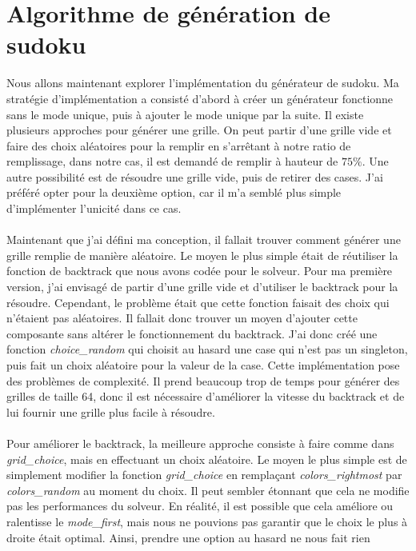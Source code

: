 \documentclass{article}
\begin{document}
\section{Algorithme de génération de sudoku}
Nous allons maintenant explorer l'implémentation du générateur de sudoku. Ma 
stratégie d'implémentation a consisté d'abord à créer un générateur fonctionne
sans le mode unique, puis à ajouter le mode unique par la suite. Il existe 
plusieurs approches pour générer une grille. On peut partir d'une grille vide 
et faire des choix aléatoires pour la remplir en s'arrêtant à notre ratio de 
remplissage, dans notre cas, il est demandé de remplir à hauteur de $75\%$. Une
autre possibilité est de résoudre une grille vide, puis de retirer des cases. 
J'ai préféré opter pour la deuxième option, car il m'a semblé plus simple 
d'implémenter l'unicité dans ce cas.
\\ \\
Maintenant que j'ai défini ma conception, il fallait trouver comment générer une
grille remplie de manière aléatoire. Le moyen le plus simple était de 
réutiliser la fonction de backtrack que nous avons codée pour le solveur. 
Pour ma première version, j'ai envisagé de partir d'une grille vide et 
d'utiliser le backtrack pour la résoudre. Cependant, le problème était que 
cette fonction faisait des choix qui n'étaient pas aléatoires. Il fallait 
donc trouver un moyen d'ajouter cette composante sans altérer le fonctionnement
du backtrack. J'ai donc créé une fonction \textit{choice\_random} qui choisit
au hasard une case qui n'est pas un singleton, puis fait un choix aléatoire
pour la valeur de la case. Cette implémentation pose des problèmes de 
complexité. Il prend beaucoup trop de temps pour générer des grilles de 
taille 64, donc il est nécessaire d'améliorer la vitesse du backtrack et de 
lui fournir une grille plus facile à résoudre.
\\ \\
Pour améliorer le backtrack, la meilleure approche consiste à faire comme dans 
\textit{grid\_choice}, mais en effectuant un choix aléatoire. Le moyen le plus 
simple est de simplement modifier la fonction \textit{grid\_choice} en 
remplaçant \textit{colors\_rightmost} par \textit{colors\_random} au moment du
 choix. Il peut sembler étonnant que cela ne modifie pas les performances du 
 solveur. En réalité, il est possible que cela améliore ou ralentisse le 
 \textit{mode\_first}, mais nous ne pouvions pas garantir que le choix le plus 
 à droite était optimal. Ainsi, prendre une option au hasard ne nous fait rien 
\end{document}
